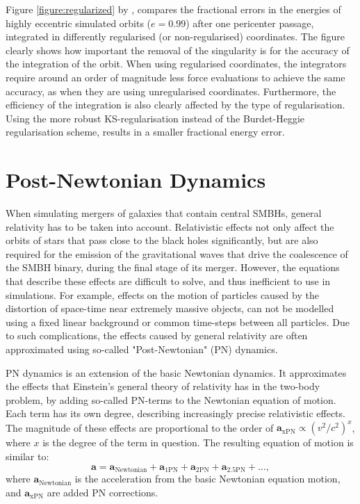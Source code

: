 \documentclass[english, twoside]{HYgradu}
\begin{document}
Figure \ref{figure:regularized} by \cite{BinneyTremaine}, compares the fractional errors in the energies of highly eccentric simulated orbits ($e = 0.99$) after one pericenter passage, integrated in differently regularised (or non-regularised) coordinates. The figure clearly shows how important the removal of the singularity is for the accuracy of the integration of the orbit. When using regularised coordinates, the integrators require around an order of magnitude less force evaluations to achieve the same accuracy, as when they are using unregularised coordinates. Furthermore, the efficiency of the integration is also clearly affected by the type of regularisation. Using the more robust KS-regularisation instead of the Burdet-Heggie regularisation scheme, results in a smaller fractional energy error.

\section{Post-Newtonian Dynamics} \label{section:PN}

When simulating mergers of galaxies that contain central SMBHs, general relativity has to be taken into account. Relativistic effects not only affect the orbits of stars that pass close to the black holes significantly, but are also required for the emission of the gravitational waves that drive the coalescence of the SMBH binary, during the final stage of its merger. However, the equations that describe these effects are difficult to solve, and thus inefficient to use in simulations. For example, effects on the motion of particles caused by the distortion of space-time near extremely massive objects, can not be modelled using a fixed linear background or common time-steps between all particles. Due to such complications, the effects caused by general relativity are often approximated using so-called "Post-Newtonian" (PN) dynamics.

PN dynamics is an extension of the basic Newtonian dynamics. It approximates the effects that Einstein's general theory of relativity has in the two-body problem, by adding so-called PN-terms to the Newtonian equation of motion. Each term has its own degree, describing increasingly precise relativistic effects. The magnitude of these effects are proportional to the order of $\mathbf{a}_\mathrm{xPN} \propto \left( v^2 / c^2 \right)^x$, where $x$ is the degree of the term in question. The resulting equation of motion is similar to:
\begin{equation}
\mathbf{a} = \mathbf{a}_\mathrm{Newtonian} + \mathbf{a}_\mathrm{1PN} + \mathbf{a}_\mathrm{2PN} + \mathbf{a}_\mathrm{2.5PN} + \ldots, \label{eq:PN_eom}
\end{equation}
where $\mathbf{a}_\mathrm{Newtonian}$ is the acceleration from the basic Newtonian equation motion, and $\mathbf{a}_\mathrm{xPN}$ are added PN corrections.
\end{document}
